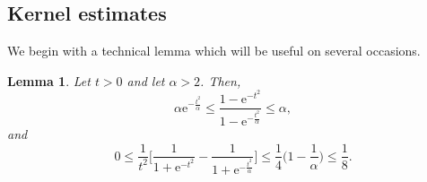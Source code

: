 \documentclass[a4paper,oneside,10pt]{amsproc}
\theoremstyle{plain}
\newtheorem{lemma}{Lemma}
\theoremstyle{remark}
\theoremstyle{definition}
\renewcommand{\leq}{\leqslant}
\renewcommand{\leq}{\leqslant}
\newcommand{\e}{\mathrm{e}} %
\renewcommand{\leq}{\leqslant}%
\begin{document}
\subsection{Kernel estimates}
We begin with a technical lemma which will be useful on several
occasions.
\begin{lemma}\label{lem:Time-part-Mehler-time-transform}
  Let $t > 0$ and let $\alpha > 2$. Then,
  \begin{equation}
    \label{eq:Time-part-Mehler-time-transform-1}
    \alpha \e^{-\frac{t^2}{\alpha}} \leq \frac{1 - \e^{-t^2}}{1 -
      \e^{-\frac{t^2}{\alpha}}} \leq \alpha,
  \end{equation}
  and
  \begin{equation}
    \label{eq:Time-part-Mehler-time-transform-2}
       0 \leq \frac1{t^2} \biggl[\frac{1}{1 + \e^{-t^2}} - \frac{1}{1 +
         \e^{-\frac{t^2}{\alpha}}} \biggr] \leq \frac{1}{4} \biggl(1 -
       \frac1\alpha \biggr) \leq \frac18.
  \end{equation}
\end{lemma}
\end{document}
